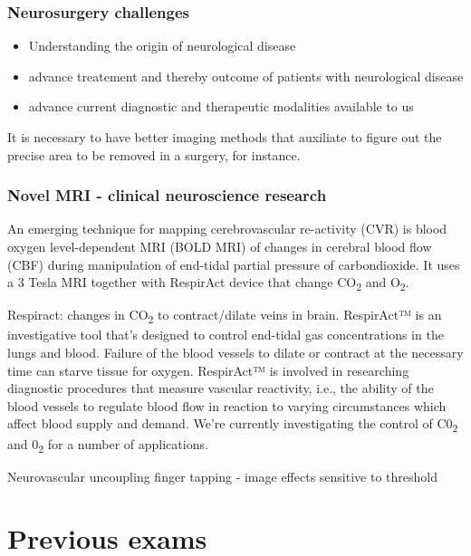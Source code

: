 \documentclass[12pt,article,oneside,a4paper]{memoir}
\begin{document}
\subsubsection{Neurosurgery challenges} 

\begin{itemize}
\item Understanding the origin of neurological disease
\item advance treatement and thereby outcome of patients with neurological
disease
\item advance current diagnostic and therapeutic modalities available to us
\end{itemize}

It is necessary to have better imaging methods that auxiliate to figure out the
precise area to be removed in a surgery, for instance.

\subsubsection{Novel MRI - clinical neuroscience research}
An emerging technique for mapping cerebrovascular re-activity (CVR) is blood
oxygen level-dependent MRI (BOLD MRI) of changes in cerebral blood flow (CBF)
during manipulation of end-tidal partial pressure of carbondioxide. It uses a
3 Tesla MRI together with RespirAct device that change CO\textsubscript{2} and
O\textsubscript{2}.

Respiract: changes in CO\textsubscript{2} to contract/dilate veins in brain.
RespirAct™ is an investigative tool that's designed to control end-tidal gas
concentrations in the lungs and blood. Failure of the blood vessels to dilate
or contract at the necessary time can starve tissue for oxygen. RespirAct™ is
involved in researching diagnostic procedures that measure vascular reactivity,
i.e., the ability of the blood vessels to regulate blood flow in reaction to
varying circumstances which affect blood supply and demand. We're currently
investigating the control of C0\textsubscript{2} and 0\textsubscript{2} for a
number of applications. 

Neurovascular uncoupling
finger tapping - image effects
sensitive to threshold

\newpage
\section{Previous exams}
\end{document}
